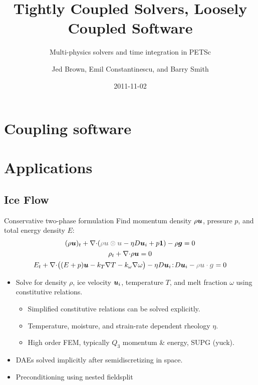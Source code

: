 \documentclass{beamer}
\title{Tightly Coupled Solvers, Loosely Coupled Software}
\subtitle{Multi-physics solvers and time integration in PETSc}
\author{Jed Brown, Emil Constantinescu, and Barry Smith}
\institute
{
  {Argonne National Laboratory} \\
}
\date{2011-11-02}
\begin{document}
\lstset{language=C}
\normalem

\begin{frame}
  \titlepage
\end{frame}




%


\section{Coupling software}


%


\section{Applications}
%
\subsection{Ice Flow}
\newcommand\smallterm[1]{{\color{gray} #1}}
\begin{frame}{Conservative two-phase formulation}
  Find momentum density $\rho\bm u$, pressure $p$, and total energy density $E$:
  \begin{gather*}
    (\rho\uu)_t + \div (\smallterm{\rho\uu\otimes\uu} - \eta D\uu_i + p\bm 1) - \rho \bm g = 0 \\
    \rho_t + \div \rho\uu = 0 \\
    E_t + \div \big((E+p)\uu - k_T\nabla T - k_\omega\nabla\omega \big) - \eta D\uu_i\tcolon D\uu_i - \smallterm{\rho\uu\cdot\bm g} = 0
  \end{gather*}
\begin{itemize}
\item Solve for density $\rho$, ice velocity $\bm u_i$, temperature $T$, and melt fraction $\omega$ using constitutive relations.
  \begin{itemize}
  \item Simplified constitutive relations can be solved explicitly.
  \item Temperature, moisture, and strain-rate dependent rheology $\eta$.
  \item High order FEM, typically $Q_3$ momentum \& energy, SUPG (yuck).
  \end{itemize}
\item DAEs solved implicitly after semidiscretizing in space.
\item Preconditioning using nested fieldsplit
\end{itemize}
\end{frame}

\end{document}
